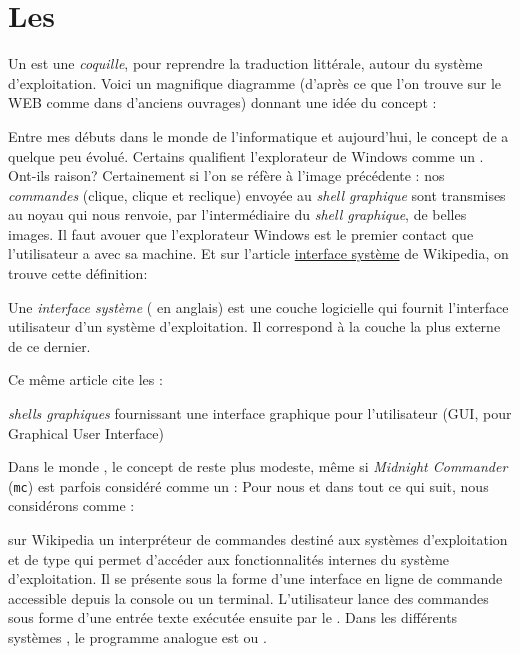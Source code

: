 
\section{Les \shells{}}
Un \shell{} est une \emph{coquille}, pour reprendre la traduction littérale, autour du système d'exploitation. Voici un magnifique diagramme (d'après ce que l'on trouve sur le WEB comme dans d'anciens ouvrages) donnant une idée du concept :


Entre mes débuts dans le monde de l'informatique et aujourd'hui, le concept de  \shell{} a quelque peu évolué. Certains qualifient l'explorateur de Windows comme un  \shell{}. Ont-ils raison? Certainement si l'on se réfère à l'image précédente : nos \emph{commandes} (clique, clique et reclique) envoyée au \emph{shell graphique} sont transmises au noyau qui nous renvoie, par l'intermédiaire du \emph{shell graphique}, de belles images. Il faut avouer que l'explorateur Windows est le premier contact que l'utilisateur a avec sa machine.  Et sur l'article \href{http://fr.wikipedia.org/wiki/Interface_syst%C3%A8me}{interface système} de Wikipedia, on trouve cette définition:

\begin{Quote}
Une \emph{interface système }( \shell{} en anglais) est une couche logicielle qui fournit l'interface utilisateur d'un système d'exploitation. Il correspond à la couche la plus externe de ce dernier.
\end{Quote}

Ce même article cite les :
\begin{Quote}
\emph{shells graphiques} fournissant une interface graphique pour l'utilisateur (GUI, pour Graphical User Interface)
\end{Quote}

Dans le monde \unix{}, le concept de  \shell{} reste plus modeste, même si \emph{Midnight Commander} (\texttt{mc}) est parfois considéré comme un \shell{}:
Pour nous et dans tout ce qui suit, nous considérons comme  \shell{} :

\begin{Quotebis}{\href{http://fr.wikipedia.org/wiki/Shell_Unix}{ \shell{} \unix{}} sur Wikipedia}
un interpréteur de commandes destiné aux systèmes d'exploitation \unix{} et de type \unix{} qui permet d'accéder aux fonctionnalités internes du système d'exploitation. Il se présente sous la forme d'une interface en ligne de commande accessible depuis la console ou un terminal. L'utilisateur lance des commandes sous forme d'une entrée texte exécutée ensuite par le  \shell{}. Dans les différents systèmes \windows, le programme analogue est  ou .
\end{Quotebis}

